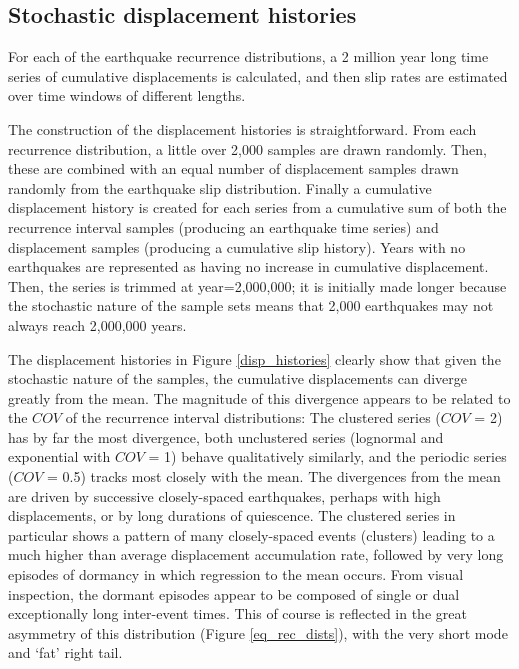 \documentclass[se, manuscript]{copernicus}
\begin{document}
\subsection{Stochastic displacement
histories}\label{stochastic-displacement-histories}

For each of the earthquake recurrence distributions, a 2 million year
long time series of cumulative displacements is calculated, and then
slip rates are estimated over time windows of different lengths.

The construction of the displacement histories is straightforward. From
each recurrence distribution, a little over 2,000 samples are drawn
randomly. Then, these are combined with an equal number of displacement
samples drawn randomly from the earthquake slip distribution. Finally a
cumulative displacement history is created for each series from a
cumulative sum of both the recurrence interval samples (producing an
earthquake time series) and displacement samples (producing a cumulative
slip history). Years with no earthquakes are represented as having no
increase in cumulative displacement. Then, the series is trimmed at
year=2,000,000; it is initially made longer because the stochastic
nature of the sample sets means that 2,000 earthquakes may not always
reach 2,000,000 years.

The displacement histories in Figure \ref{disp_histories} clearly show
that given the stochastic nature of the samples, the cumulative
displacements can diverge greatly from the mean. The magnitude of this
divergence appears to be related to the \(COV\) of the recurrence
interval distributions: The clustered series (\(COV\) = 2) has by far
the most divergence, both unclustered series (lognormal and exponential
with \(COV\) = 1) behave qualitatively similarly, and the periodic
series (\(COV\) = 0.5) tracks most closely with the mean. The
divergences from the mean are driven by successive closely-spaced
earthquakes, perhaps with high displacements, or by long durations of
quiescence. The clustered series in particular shows a pattern of many
closely-spaced events (clusters) leading to a much higher than average
displacement accumulation rate, followed by very long episodes of
dormancy in which regression to the mean occurs. From visual inspection,
the dormant episodes appear to be composed of single or dual
exceptionally long inter-event times. This of course is reflected in the
great asymmetry of this distribution (Figure \ref{eq_rec_dists}), with
the very short mode and `fat' right tail.
\end{document}
